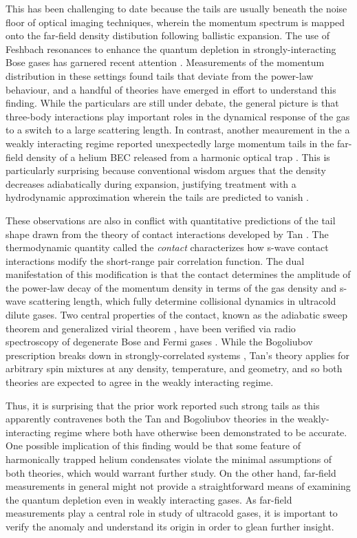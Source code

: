 	This has been challenging to date because the tails are usually beneath the noise floor of optical imaging techniques, wherein the momentum spectrum is mapped onto the far-field density distibution following ballistic expansion.
	The use of Feshbach resonances to enhance the quantum depletion in strongly-interacting Bose gases has garnered recent attention \cite{Makotyn14,Fletcher17,Eigen18}.
	Measurements of the momentum distribution in these settings \cite{Makotyn14,Eigen18} found tails that deviate from the power-law behaviour, and a handful of theories have emerged \cite{Kira15_coherent,Colussi20,Smith14} in effort to understand this finding. 
	While the particulars are still under debate, the general picture is that three-body interactions play important roles in the dynamical response of the gas to a switch to a large scattering length.
	In contrast, another meaurement in the a weakly interacting regime reported unexpectedly large momentum tails in the far-field density of a helium BEC released from a harmonic optical trap \cite{Chang16}. 
	This is particularly surprising because conventional wisdom argues that the density decreases adiabatically during expansion, justifying treatment with a hydrodynamic approximation wherein the tails are predicted to vanish \cite{Qu16}. 

	These observations are also in conflict with quantitative predictions of the tail shape drawn from the theory of contact interactions developed by Tan \cite{Tan08_energetics,Tan08_momentum,Tan08_virial}.
	The thermodynamic quantity called the \emph{contact} characterizes how s-wave contact interactions modify the short-range pair correlation function. 
	The dual manifestation of this modification is that the contact determines the amplitude of the power-law decay of the momentum density in terms of the gas density and s-wave scattering length, which fully determine collisional dynamics in ultracold dilute gases. 
	Two central properties of the contact, known as the adiabatic sweep theorem and generalized virial theorem \cite{Tan08_momentum,Tan08_virial}, have been verified via radio spectroscopy \cite{Baym07,Punk07,Braaten10} of degenerate Bose \cite{Wild12} and Fermi gases \cite{Stewart10,sagi12}. 
	While the Bogoliubov prescription breaks down in strongly-correlated systems \cite{Lopes17_quasiparticle}, Tan’s theory applies for arbitrary spin mixtures at any density, temperature, and geometry, and so both theories are expected to agree in the weakly interacting regime.

	Thus, it is surprising that the prior work reported such strong tails as this apparently contravenes both the Tan and Bogoliubov theories in the weakly-interacting regime where both have otherwise been demonstrated to be accurate.
	One possible implication of this finding would be that some feature of harmonically trapped helium condensates violate the minimal assumptions of both theories, which would warrant further study.
	On the other hand, far-field measurements in general might not provide a straightforward means of examining the quantum depletion even in weakly interacting gases.
	As far-field measurements play a central role in study of ultracold gases, it is important to verify the anomaly and understand its origin in order to glean further insight.

